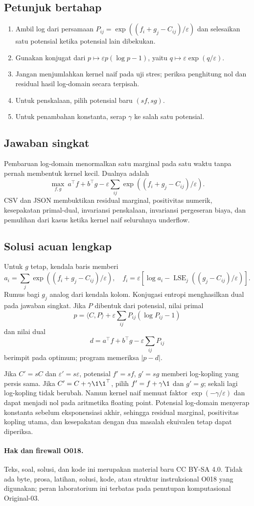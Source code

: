 \subsection*{Petunjuk bertahap}
\label{orig03:lab:hint:0004}
\begin{enumerate}
  \item Ambil log dari persamaan $P_{ij}=\exp((f_i+g_j-C_{ij})/\varepsilon)$
    dan selesaikan satu potensial ketika potensial lain dibekukan.
  \item Gunakan konjugat dari $p\mapsto\varepsilon p(\log p-1)$, yaitu
    $q\mapsto\varepsilon\exp(q/\varepsilon)$.
  \item Jangan menjumlahkan kernel naif pada uji stres; periksa penghitung nol
    dan residual hasil log-domain secara terpisah.
  \item Untuk penskalaan, pilih potensial baru $(sf,sg)$.
  \item Untuk penambahan konstanta, serap $\gamma$ ke salah satu potensial.
\end{enumerate}

\subsection*{Jawaban singkat}
\label{orig03:lab:answer:0004}
Pembaruan log-domain menormalkan satu marginal pada satu waktu tanpa pernah
membentuk kernel kecil. Dualnya adalah
\[
 \max_{f,g}\ a^\top f+b^\top g-
 \varepsilon\sum_{ij}\exp((f_i+g_j-C_{ij})/\varepsilon).
\]
CSV dan JSON membuktikan residual marginal, positivitas numerik, kesepakatan
primal-dual, invariansi penskalaan, invariansi pergeseran biaya, dan pemulihan
dari kasus ketika kernel naif seluruhnya underflow.

\subsection*{Solusi acuan lengkap}
\label{orig03:lab:solution:0004}
Untuk $g$ tetap, kendala baris memberi
\[
 a_i=\sum_j\exp((f_i+g_j-C_{ij})/\varepsilon),
 \quad
 f_i=\varepsilon\left[\log a_i-
 \operatorname{LSE}_j((g_j-C_{ij})/\varepsilon)\right].
\]
Rumus bagi $g_j$ analog dari kendala kolom. Konjugasi entropi menghasilkan
dual pada jawaban singkat. Jika $P$ dibentuk dari potensial, nilai primal
\[
 p=\langle C,P\rangle+\varepsilon\sum_{ij}P_{ij}(\log P_{ij}-1)
\]
dan nilai dual
\[
 d=a^\top f+b^\top g-\varepsilon\sum_{ij}P_{ij}
\]
berimpit pada optimum; program memeriksa $|p-d|$.

Jika $C'=sC$ dan $\varepsilon'=s\varepsilon$, potensial
$f'=sf$, $g'=sg$ memberi log-kopling yang persis sama. Jika
$C'=C+\gamma\1\1^\top$, pilih $f'=f+\gamma\1$ dan $g'=g$;
sekali lagi log-kopling tidak berubah. Namun kernel naif memuat faktor
$\exp(-\gamma/\varepsilon)$ dan dapat menjadi nol pada aritmetika floating
point. Potensial log-domain menyerap konstanta sebelum eksponensiasi akhir,
sehingga residual marginal, positivitas kopling utama, dan kesepakatan dengan
dua masalah ekuivalen tetap dapat diperiksa.

\paragraph{Hak dan firewall O018.}
Teks, soal, solusi, dan kode ini merupakan material baru CC BY-SA 4.0. Tidak
ada byte, prosa, latihan, solusi, kode, atau struktur instruksional O018 yang
digunakan; peran laboratorium ini terbatas pada penutupan komputasional
Original-03.
